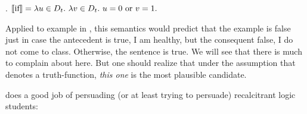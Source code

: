 \ex.\label{ex:material} $\llbracket \mbox{if} \rrbracket = \lambda u \in D_t.\ \lambda v \in D_t.\ u=0 \mbox{ or } v=1.$

Applied to example in \LLast, this semantics would predict that the example is false just in case the antecedent is true, I am healthy, but the consequent false, I do not come to class. Otherwise, the sentence is true. We will see that there is much to complain about here. But one should realize that under the assumption that  denotes a truth-function, \emph{this one} is the most plausible candidate.

\citet{suber:1997:material} does a good job of persuading (or at least trying to persuade) recalcitrant logic students:

